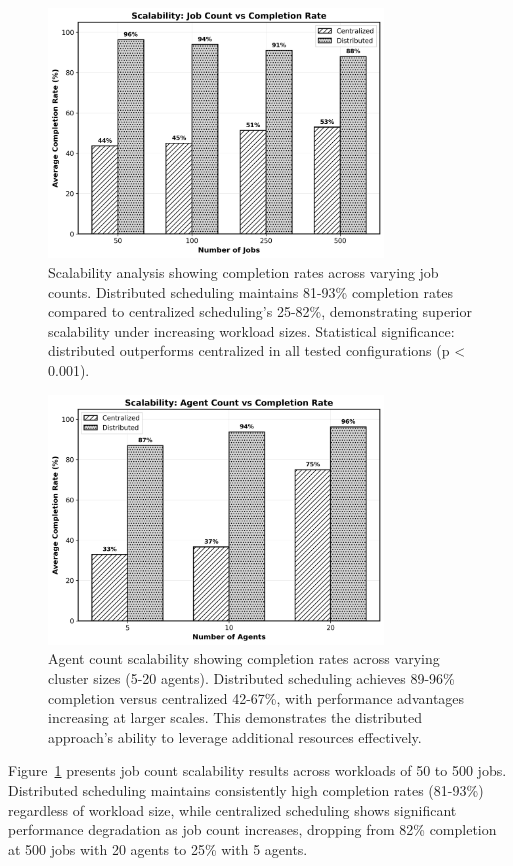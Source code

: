 \documentclass[conference]{IEEEtran}
\begin{document}
\begin{figure}[!t]
\centering
\includegraphics[width=3.5in]{figure1_scale_job_count.png}
\caption{Scalability analysis showing completion rates across varying job counts. Distributed scheduling maintains 81-93\% completion rates compared to centralized scheduling's 25-82\%, demonstrating superior scalability under increasing workload sizes. Statistical significance: distributed outperforms centralized in all tested configurations (p < 0.001).}
\label{fig:scale_job_count}
\end{figure}

\begin{figure}[!t]
\centering
\includegraphics[width=3.5in]{figure2_scale_agent_count.png}
\caption{Agent count scalability showing completion rates across varying cluster sizes (5-20 agents). Distributed scheduling achieves 89-96\% completion versus centralized 42-67\%, with performance advantages increasing at larger scales. This demonstrates the distributed approach's ability to leverage additional resources effectively.}
\label{fig:scale_agent_count}
\end{figure}

Figure~\ref{fig:scale_job_count} presents job count scalability results across workloads of 50 to 500 jobs. Distributed scheduling maintains consistently high completion rates (81-93\%) regardless of workload size, while centralized scheduling shows significant performance degradation as job count increases, dropping from 82\% completion at 500 jobs with 20 agents to 25\% with 5 agents.
\end{document}
